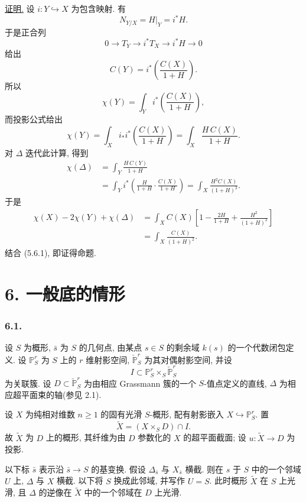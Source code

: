 \noindent\underline{证明.}
设 $i:Y\hookrightarrow X$ 为包含映射. 有
\[
N_{Y/X}=H|_Y=i^*H.
\]
于是正合列
\[
0\longrightarrow T_Y
\longrightarrow i^*T_X
\longrightarrow i^*H
\longrightarrow0
\]
给出
\begin{equation}\tag{5.7.4}
C(Y)=i^*\!\left(\frac{C(X)}{1+H}\right).
\end{equation}
所以
\[
\chi(Y)=\int_Yi^*\!\left(\frac{C(X)}{1+H}\right),
\]
而投影公式给出
\begin{equation}\tag{5.7.5}
\chi(Y)
=\int_Xi_*i^*\!\left(\frac{C(X)}{1+H}\right)
=\int_X\frac{H\,C(X)}{1+H}.
\end{equation}
对 $\Delta$ 迭代此计算, 得到
\begin{equation}\tag{5.7.6}
\begin{aligned}
\chi(\Delta)
&=\int_Y\frac{H\,C(Y)}{1+H}\\
&=\int_Yi^*\!\left(
  \frac{H}{1+H}\cdot\frac{C(X)}{1+H}
  \right)
=\int_X\frac{H^2C(X)}{(1+H)^2}.
\end{aligned}
\end{equation}
于是
\[
\begin{aligned}
\chi(X)-2\chi(Y)+\chi(\Delta)
&=\int_XC(X)\left[
1-\frac{2H}{1+H}+\frac{H^2}{(1+H)^2}
\right]\\
&=\int_X\frac{C(X)}{(1+H)^2}.
\end{aligned}
\]
结合 (5.6.1), 即证得命题.

\section*{6. 一般底的情形}

\subsubsection*{6.1.}
设 $S$ 为概形, $\bar s$ 为 $S$ 的几何点, 由某点 $s\in S$ 的剩余域 $k(s)$ 的一个代数闭包定义. 设 $\mathbb P^r_S$ 为 $S$ 上的 $r$ 维射影空间, $\check{\mathbb P}^{r}_S$ 为其对偶射影空间, 并设
\[
I\subset\mathbb P^r_S\times_S\check{\mathbb P}^{r}_S
\]
为关联簇. 设 $D\subset\check{\mathbb P}^{r}_S$ 为由相应 Grassmann 簇的一个 $S$-值点定义的直线, $\Delta$ 为相应超平面束的轴(参见 2.1).

设 $X$ 为纯相对维数 $n\geq1$ 的固有光滑 $S$-概形, 配有射影嵌入 $X\hookrightarrow\mathbb P^r_S$. 置
\[
\widetilde X=(X\times_SD)\cap I.
\]
故 $\widetilde X$ 为 $D$ 上的概形, 其纤维为由 $D$ 参数化的 $X$ 的超平面截面; 设 $u:\widetilde X\to D$ 为投影.

以下标 $\bar s$ 表示沿 $\bar s\to S$ 的基变换. 假设 $\Delta_{\bar s}$ 与 $X_{\bar s}$ 横截. 则在 $s$ 于 $S$ 中的一个邻域 $U$ 上, $\Delta$ 与 $X$ 横截. 以下将 $S$ 换成此邻域, 并写作 $U=S$. 此时概形 $\widetilde X$ 在 $S$ 上光滑, 且 $\Delta$ 的逆像在 $\widetilde X$ 中的一个邻域在 $D$ 上光滑.


